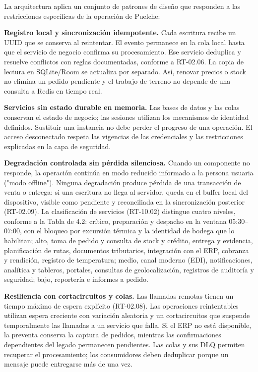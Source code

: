 La arquitectura aplica un conjunto de patrones de diseño que responden a las restricciones específicas de la operación de Puelche:

\textbf{Registro local y sincronización idempotente.} Cada escritura recibe un UUID que se conserva al reintentar. El evento permanece en la cola local hasta que el servicio de negocio confirma su procesamiento. Ese servicio deduplica y resuelve conflictos con reglas documentadas, conforme a RT-02.06. La copia de lectura en SQLite/Room se actualiza por separado. Así, renovar precios o stock no elimina un pedido pendiente y el trabajo de terreno no depende de una consulta a Redis en tiempo real.

\textbf{Servicios sin estado durable en memoria.} Las bases de datos y las colas conservan el estado de negocio; las sesiones utilizan los mecanismos de identidad definidos. Sustituir una instancia no debe perder el progreso de una operación. El acceso desconectado respeta las vigencias de las credenciales y las restricciones explicadas en la capa de seguridad.

\textbf{Degradación controlada sin pérdida silenciosa.} Cuando un componente no responde, la operación continúa en modo reducido informado a la persona usuaria ("modo offline"). Ninguna degradación produce pérdida de una transacción de venta o entrega: si una escritura no llega al servidor, queda en el buffer local del dispositivo, visible como pendiente y reconciliada en la sincronización posterior (RT-02.09). La clasificación de servicios (RT-10.02) distingue cuatro niveles, conforme a la Tabla de 4.2: crítico, preparación y despacho en la ventana 05:30--07:00, con el bloqueo por excursión térmica y la identidad de bodega que lo habilitan; alto, toma de pedido y consulta de stock y crédito, entrega y evidencia, planificación de rutas, documentos tributarios, integración con el ERP, cobranza y rendición, registro de temperatura; medio, canal moderno (EDI), notificaciones, analítica y tableros, portales, consultas de geolocalización, registros de auditoría y seguridad; bajo, reportería e informes a pedido.

\textbf{Resiliencia con cortacircuitos y colas.} Las llamadas remotas tienen un tiempo máximo de espera explícito (RT-02.08). Las operaciones reintentables utilizan espera creciente con variación aleatoria y un cortacircuitos que suspende temporalmente las llamadas a un servicio que falla. Si el ERP no está disponible, la preventa conserva la captura de pedidos, mientras las confirmaciones dependientes del legado permanecen pendientes. Las colas y sus DLQ permiten recuperar el procesamiento; los consumidores deben deduplicar porque un mensaje puede entregarse más de una vez.

